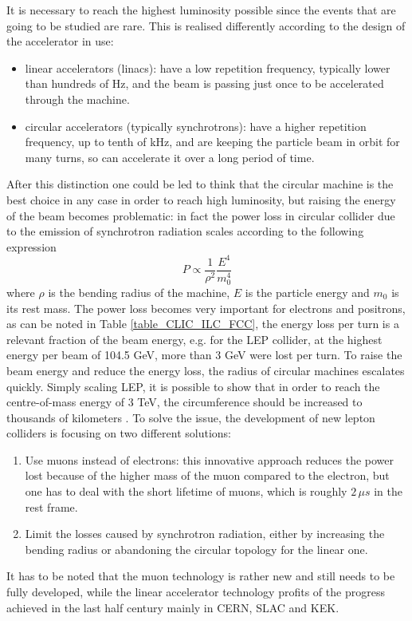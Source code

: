 It is necessary to reach the highest luminosity possible since the events that are going to be studied are rare. This is realised differently according to the design of the accelerator in use:
\begin{itemize}
\item linear accelerators (linacs): have a low repetition frequency, typically lower than hundreds of Hz, and the beam is passing just once to be accelerated through the machine.
\item circular accelerators (typically synchrotrons): have a higher repetition frequency, up to tenth of kHz, and are keeping the particle beam in orbit for many turns, so can accelerate it over a long period of time.
\end{itemize}
After this distinction one could be led to think that the circular machine is the best choice in any case in order to reach high luminosity, but raising the energy of the beam becomes problematic: in fact the power loss in circular collider due to the emission of synchrotron radiation scales according to the following expression
\begin{equation}
P \propto \frac{1}{\rho^2} \frac{E^4}{m_0^4}
\end{equation}
where $\rho$ is the bending radius of the machine, $E$ is the particle energy and $m_0$ is its rest mass. The power loss becomes very important for electrons and positrons, as can be noted in Table \ref{table_CLIC_ILC_FCC}, the energy loss per turn is a relevant fraction of the beam energy, e.g. for the LEP collider, at the highest  energy per beam of 104.5 GeV, more than 3 GeV were lost per turn. To raise the beam energy and reduce the energy loss, the radius of circular machines escalates quickly. Simply scaling LEP, it is possible to show that in order to reach the centre-of-mass energy of 3 TeV, the circumference should be increased to thousands of kilometers \cite{nature:CLIC}.
To solve the issue, the development of new lepton colliders is focusing on two different solutions:
\begin{enumerate}
\item Use muons instead of electrons: this innovative approach reduces the power lost because of the higher mass of the muon compared to the electron, but one has to deal with the short lifetime of muons, which is roughly $2 \, \mu s$ in the rest frame.
\item Limit the losses caused by synchrotron radiation, either by increasing the bending radius or abandoning the circular topology for the linear one.
\end{enumerate}
It has to be noted that the muon technology is rather new and still needs to be fully developed, while the linear accelerator technology profits of the progress achieved in the last half century mainly in CERN, SLAC and KEK.


